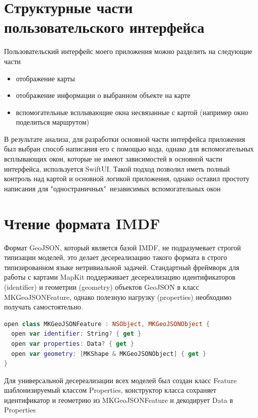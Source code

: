   \section{Структурные части пользовательского интерфейса}
    Пользовательский интерфейс моего приложения можно разделить на следующие части
    \begin{itemize}
      \item отображение карты
      \item отображение информации о выбранном объекте на карте
      \item вспомогательные всплывающие окна несвязанные с картой (например окно поделиться маршрутом)
    \end{itemize}

    В результате анализа, для разработки основной части интерфейса приложения был выбран способ написания его с помощью кода, однако для вспомогательных всплывающих окон, которые не имеют зависимостей в основной части интерфейса, используется SwiftUI. Такой подход позволил иметь полный контроль над картой и основной логикой приложения, однако оставил простоту написания для "одностраничных"\ независимых вспомогательных окон


  \section{Чтение формата IMDF}
    Формат GeoJSON, который является базой IMDF, не подразумевает строгой типизации моделей, это делает десереализацию такого формата в строго типизированном языке нетривиальной задачей. Стандартный фреймворк для работы с картами MapKit поддерживает десереализацию идентификаторов (identifier) и геометрии (geometry) объектов GeoJSON в класс MKGeoJSONFeature, однако полезную нагрузку (properties) необходимо получать самостоятельно.

    \begin{lstlisting}[language=swift,caption={Интерфейс объекта MKGeoJSONFeature}]
open class MKGeoJSONFeature : NSObject, MKGeoJSONObject {
  open var identifier: String? { get }
  open var properties: Data? { get }
  open var geometry: [MKShape & MKGeoJSONObject] { get }
}
  \end{lstlisting}

    Для универсальной десереализации всех моделей был создан класс Feature шаблонизируемый классом Properties, конструктор класса сохраняет идентификатор и геометрию из MKGeoJSONFeature и декодирует Data в Properties

